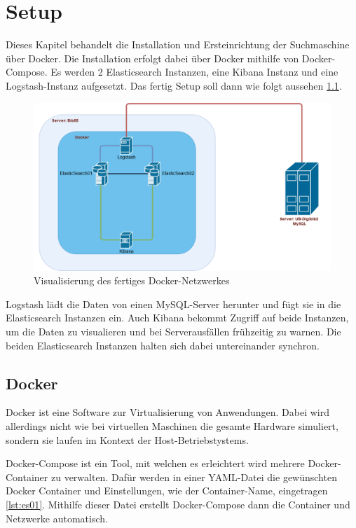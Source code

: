 \chapter{Setup}

Dieses Kapitel behandelt die Installation und Ersteinrichtung der Suchmaschine über Docker. Die Installation erfolgt dabei über Docker mithilfe von Docker-Compose. Es werden 2 Elasticsearch Instanzen, eine Kibana Instanz und eine Logstash-Instanz aufgesetzt. Das fertig Setup soll dann wie folgt aussehen \ref{img:dockerNetwork}.

\begin{figure}
	\centering
	\includegraphics[width=1\linewidth]{images/docker_structure.png}
	\caption{Visualisierung des fertiges Docker-Netzwerkes}
	\label{img:dockerNetwork}
\end{figure}

Logstash lädt die Daten von einen MySQL-Server herunter und fügt sie in die Elasticsearch Instanzen ein. Auch Kibana bekommt Zugriff auf beide Instanzen, um die Daten zu visualieren und bei Serverausfällen frühzeitig zu warnen. Die beiden Elasticsearch Instanzen halten sich dabei untereinander synchron. 

\section{Docker}

Docker ist eine Software zur Virtualisierung von Anwendungen. Dabei wird allerdings nicht wie bei virtuellen Maschinen die gesamte Hardware simuliert, sondern sie laufen im Kontext der Host-Betriebstystems.

Docker-Compose ist ein Tool, mit welchen es erleichtert wird mehrere Docker-Container zu verwalten. Dafür werden in einer YAML-Datei die gewünschten Docker Container und Einstellungen, wie der Container-Name, eingetragen \ref{lst:es01}. Mithilfe dieser Datei erstellt Docker-Compose dann die Container und Netzwerke automatisch.

